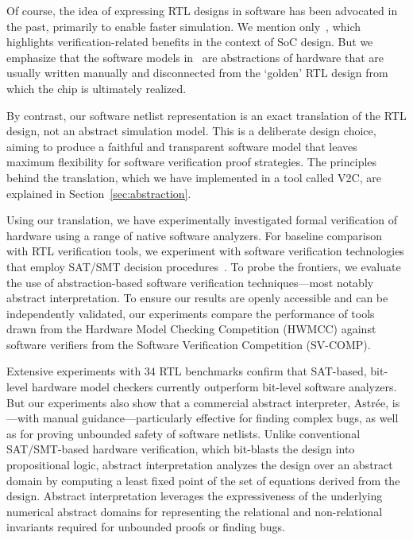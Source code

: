 Of course, the idea of expressing RTL designs in software has been
advocated in the past, primarily to enable faster simulation.  We mention
only~\cite{soc-keating}, which highlights verification-related benefits in
the context of SoC design.  But we emphasize that the software models
in~\cite{soc-keating} are abstractions of hardware that are usually written
manually and disconnected from the `golden' RTL design from which the chip
is ultimately realized.

By contrast, our software netlist representation is an exact
translation of the RTL design, not an abstract simulation model.  This is a
deliberate design choice, aiming to produce a faithful and transparent
software model that leaves maximum flexibility for software verification
proof strategies.  The principles behind the translation, which we have
implemented in a tool called \textsc{V2C}, are explained in
Section~\ref{sec:abstraction}.

Using our translation, we have experimentally investigated formal
verification of hardware using a range of native software analyzers.  For
baseline comparison with RTL verification tools, we experiment with software
verification technologies that employ SAT/SMT decision
procedures~\cite{DBLP:conf/cav/BeyerK11, 2ls, cbmc.tacas:2004,
DBLP:conf/tacas/HeizmannDGLMSP16}.  To probe the frontiers, we evaluate the
use of abstraction-based software verification techniques---most notably
abstract interpretation.  To ensure our results are openly accessible and
can be independently validated, our experiments compare the performance of
tools drawn from the Hardware Model Checking Competition
(HWMCC) against software verifiers from the Software Verification
Competition (SV-COMP).

Extensive experiments with 34 RTL benchmarks confirm that SAT-based,
bit-level hardware model checkers currently outperform bit-level software
analyzers.  But our experiments also show that a commercial abstract
interpreter, Astr{\'e}e, is---with manual guidance---particularly effective for
finding complex bugs, as well as for proving unbounded safety of software netlists.  
Unlike conventional SAT/SMT-based hardware verification, which
bit-blasts the design into propositional logic, abstract interpretation
analyzes the design over an abstract domain by computing a least fixed
point of the set of equations derived from the design.  Abstract
interpretation leverages the expressiveness of the underlying
numerical abstract domains for representing the relational and
non-relational invariants required for unbounded proofs or finding bugs.

